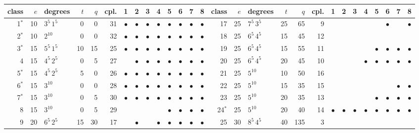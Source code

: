 \begin{tabular}{@{}rrlrrr@{\hspace{6pt}}cccccccc@{\hspace{14pt}}rrlrrr@{\hspace{6pt}}cccccccc@{}}
\toprule
class & $e$ & degrees & $t$ & $q$ & cpl. & 1&2&3&4&5&6&7&8 & class & $e$ & degrees & $t$ & $q$ & cpl. & 1&2&3&4&5&6&7&8 \\
\midrule
1$^{*}$ & 10 & $3^{5}\,1^{5}$ & 0 & 0 & 31 & $\bullet$ & $\bullet$ & $\bullet$ & $\bullet$ & $\bullet$ & $\bullet$ & $\bullet$ & $\bullet$ & 17 & 25 & $7^{5}\,3^{5}$ & 25 & 65 & 9 &  &  &  &  &  & $\bullet$ &  & $\bullet$ \\
2$^{*}$ & 10 & $2^{10}$ & 0 & 0 & 32 & $\bullet$ & $\bullet$ & $\bullet$ & $\bullet$ & $\bullet$ & $\bullet$ & $\bullet$ & $\bullet$ & 18 & 25 & $6^{5}\,4^{5}$ & 15 & 45 & 12 &  &  &  &  &  &  &  &  \\
3$^{*}$ & 15 & $5^{5}\,1^{5}$ & 10 & 15 & 25 & $\bullet$ & $\bullet$ & $\bullet$ & $\bullet$ & $\bullet$ & $\bullet$ & $\bullet$ & $\bullet$ & 19 & 25 & $6^{5}\,4^{5}$ & 15 & 55 & 11 &  &  &  &  & $\bullet$ & $\bullet$ & $\bullet$ & $\bullet$ \\
4 & 15 & $4^{5}\,2^{5}$ & 0 & 5 & 27 &  & $\bullet$ & $\bullet$ & $\bullet$ & $\bullet$ & $\bullet$ & $\bullet$ & $\bullet$ & 20 & 25 & $6^{5}\,4^{5}$ & 20 & 45 & 10 &  &  &  & $\bullet$ & $\bullet$ & $\bullet$ & $\bullet$ & $\bullet$ \\
5$^{*}$ & 15 & $4^{5}\,2^{5}$ & 5 & 0 & 26 & $\bullet$ & $\bullet$ & $\bullet$ & $\bullet$ & $\bullet$ & $\bullet$ & $\bullet$ & $\bullet$ & 21 & 25 & $5^{10}$ & 10 & 50 & 16 &  &  &  &  &  &  &  &  \\
6$^{*}$ & 15 & $3^{10}$ & 0 & 0 & 28 & $\bullet$ & $\bullet$ & $\bullet$ & $\bullet$ & $\bullet$ & $\bullet$ & $\bullet$ & $\bullet$ & 22 & 25 & $5^{10}$ & 15 & 35 & 15 &  &  &  &  &  &  & $\bullet$ & $\bullet$ \\
7$^{*}$ & 15 & $3^{10}$ & 0 & 5 & 30 & $\bullet$ & $\bullet$ & $\bullet$ & $\bullet$ & $\bullet$ & $\bullet$ & $\bullet$ & $\bullet$ & 23 & 25 & $5^{10}$ & 20 & 35 & 13 &  &  &  &  & $\bullet$ & $\bullet$ & $\bullet$ & $\bullet$ \\
8 & 15 & $3^{10}$ & 0 & 5 & 29 &  &  &  &  & $\bullet$ & $\bullet$ & $\bullet$ & $\bullet$ & 24$^{*}$ & 25 & $5^{10}$ & 20 & 40 & 14 & $\bullet$ & $\bullet$ & $\bullet$ & $\bullet$ & $\bullet$ & $\bullet$ & $\bullet$ & $\bullet$ \\
9 & 20 & $6^{5}\,2^{5}$ & 15 & 30 & 17 &  & $\bullet$ &  & $\bullet$ & $\bullet$ & $\bullet$ & $\bullet$ & $\bullet$ & 25 & 30 & $8^{5}\,4^{5}$ & 40 & 135 & 3 &  &  &  &  &  &  &  &  \\

\end{tabular}

